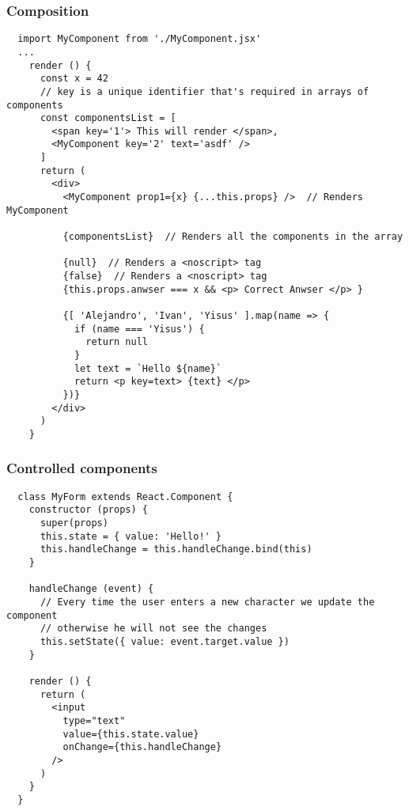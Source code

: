 \begin{frame}[fragile]
  \frametitle{Composition}
  \begin{verbatim}
  import MyComponent from './MyComponent.jsx'
  ...
    render () {
      const x = 42
      // key is a unique identifier that's required in arrays of components
      const componentsList = [
        <span key='1'> This will render </span>,
        <MyComponent key='2' text='asdf' />
      ]
      return (
        <div>
          <MyComponent prop1={x} {...this.props} />  // Renders MyComponent

          {componentsList}  // Renders all the components in the array

          {null}  // Renders a <noscript> tag
          {false}  // Renders a <noscript> tag
          {this.props.anwser === x && <p> Correct Anwser </p> }

          {[ 'Alejandro', 'Ivan', 'Yisus' ].map(name => {
            if (name === 'Yisus') {
              return null
            }
            let text = `Hello ${name}`
            return <p key=text> {text} </p>
          })}
        </div>
      )
    }
  \end{verbatim}
\end{frame}

\begin{frame}[fragile]

  \frametitle{Controlled components}

  \begin{verbatim}
  class MyForm extends React.Component {
    constructor (props) {
      super(props)
      this.state = { value: 'Hello!' }
      this.handleChange = this.handleChange.bind(this)
    }

    handleChange (event) {
      // Every time the user enters a new character we update the component
      // otherwise he will not see the changes
      this.setState({ value: event.target.value })
    }

    render () {
      return (
        <input
          type="text"
          value={this.state.value}
          onChange={this.handleChange}
        />
      )
    }
  }
  \end{verbatim}

\end{frame}
